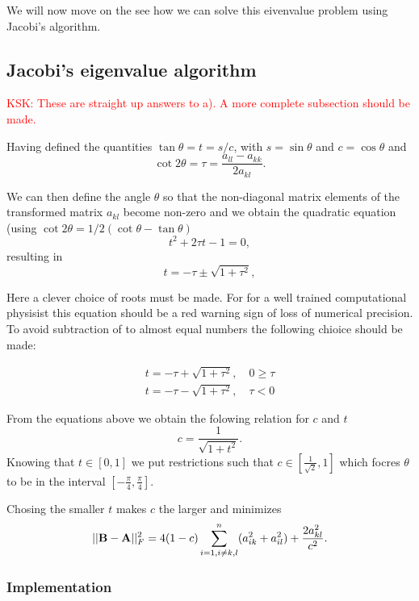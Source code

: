 \documentclass[11pt,a4paper,english]{article}
\numberwithin{equation}{section}
\begin{document}
We will now move on the see how we can solve this eivenvalue problem using Jacobi's algorithm. 
 
\subsection{Jacobi's eigenvalue algorithm}

\textcolor{red}{KSK: These are straight up answers to a). A more complete subsection should be made.}

Having defined the quantities $\tan\theta = t= s/c$, with $s=\sin\theta$ and $c=\cos\theta$ and
\[\cot 2\theta=\tau = \frac{a_{ll}-a_{kk}}{2a_{kl}}.
\]

We can then define the angle $\theta$ so that the non-diagonal matrix elements of the transformed matrix 
$a_{kl}$ become non-zero and
we obtain the quadratic equation (using $\cot 2\theta=1/2(\cot \theta-\tan\theta)$
\[
t^2+2\tau t-1= 0,
\]
resulting in 
\[
  t = -\tau \pm \sqrt{1+\tau^2},
\]

Here a clever choice of roots must be made. For for a well trained computational physisist this equation should be a red warning sign of loss of numerical precision. To avoid subtraction of to almost equal numbers the following chioice should be made:

\begin{align*}
t=  -\tau + \sqrt{1+\tau^2}, \quad   0  \geq \tau \\
t=  -\tau - \sqrt{1+\tau^2}, \quad   \tau <  0
\end{align*}

From the equations above we obtain the folowing relation for $c$ and $t$
\[
   c = \frac{1}{\sqrt{1+t^2}}.
\]
Knowing that $t \in [0,1]$ we put restrictions such that $c \in [\frac{1}{\sqrt{2}}, 1]$ which focres $\theta$ to be in the interval $[- \frac{\pi}{4},\frac{\pi}{4}]$.  

Chosing the smaller $t$ makes $c$ the larger and minimizes 
\[
||{\bf B}-{\bf A}||_F^2=4(1-c)\sum_{i=1,i\ne k,l}^n(a_{ik}^2+a_{il}^2) +\frac{2a_{kl}^2}{c^2}.
\]


\subsubsection{Implementation}
\end{document}
